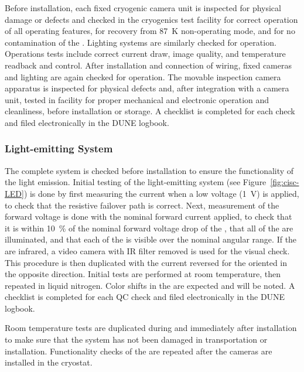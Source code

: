 Before installation, each fixed cryogenic camera unit is inspected for physical damage or defects and checked in the cryogenics test facility  for correct operation of all operating features, for recovery from \SI{87}{K} non-operating mode, and for no contamination of the \lar{}. Lighting systems are similarly checked for operation. Operations tests include correct current draw, image quality, and temperature readback and control. After installation and connection of wiring, fixed cameras and lighting are again  checked for operation. The movable inspection camera apparatus is inspected for physical defects and, after integration with a camera unit, tested in facility for proper mechanical and electronic operation and cleanliness, before installation or storage. A checklist is completed for each  check and filed electronically in the DUNE logbook. 

\subsubsection{Light-emitting System}
\label{sec:fdgen-slow-cryo-qc-les}

The complete system is checked before installation to ensure the functionality of the light emission. 
Initial testing of the light-emitting system (see Figure~\ref{fig:cisc-LED}) is done by first
measuring the current when a low voltage (\SI{1}{V}) is applied, to check
that the resistive  failover path is correct. Next, measurement
of the forward voltage is done with the nominal forward current applied, to
check that it is within \SI{10}{\%} of the nominal forward voltage drop of
the , that all of the  are illuminated, and that each of the
 is visible over the nominal angular range. If the  are
infrared, a video camera with IR filter removed is used for the
visual check. This procedure is then duplicated with the current
reversed for the  oriented in the opposite direction. Initial tests are performed at room temperature, then repeated in liquid nitrogen. Color shifts in the  are expected and will be noted. A checklist is completed for each QC check and filed electronically in the DUNE logbook.

Room temperature tests are duplicated during and immediately after installation to make sure that the system has not been damaged in transportation or installation. Functionality checks of the  are repeated after the cameras are installed in the cryostat.

